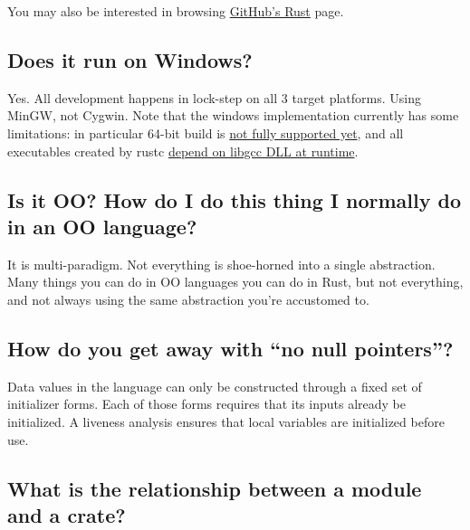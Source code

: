 \documentclass[]{article}
\begin{document}
You may also be interested in browsing
\href{https://github.com/trending?l=rust}{GitHub's Rust} page.

\subsection{Does it run on Windows?}\label{does-it-run-on-windows}

Yes. All development happens in lock-step on all 3 target platforms.
Using MinGW, not Cygwin. Note that the windows implementation currently
has some limitations: in particular 64-bit build is
\href{https://github.com/rust-lang/rust/issues/1237}{not fully supported
yet}, and all executables created by rustc
\href{https://github.com/rust-lang/rust/issues/11782}{depend on libgcc
DLL at runtime}.

\subsection{Is it OO? How do I do this thing I normally do in an OO
language?}\label{is-it-oo-how-do-i-do-this-thing-i-normally-do-in-an-oo-language}

It is multi-paradigm. Not everything is shoe-horned into a single
abstraction. Many things you can do in OO languages you can do in Rust,
but not everything, and not always using the same abstraction you're
accustomed to.

\subsection{How do you get away with ``no null
pointers''?}\label{how-do-you-get-away-with-no-null-pointers}

Data values in the language can only be constructed through a fixed set
of initializer forms. Each of those forms requires that its inputs
already be initialized. A liveness analysis ensures that local variables
are initialized before use.

\subsection{What is the relationship between a module and a
crate?}\label{what-is-the-relationship-between-a-module-and-a-crate}
\end{document}
